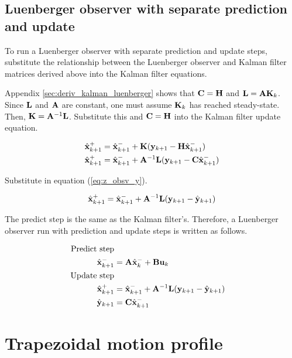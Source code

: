 \subsection{Luenberger observer with separate prediction and update}
\label{subsec:deriv_luenberger_separate}

To run a Luenberger \gls{observer} with separate prediction and update steps,
substitute the relationship between the Luenberger \gls{observer} and Kalman
filter matrices derived above into the Kalman filter equations.

Appendix \ref{sec:deriv_kalman_luenberger} shows that $\mathbf{C} = \mathbf{H}$ and
$\mathbf{L} = \mathbf{A}\mathbf{K}_k$. Since $\mathbf{L}$ and $\mathbf{A}$ are constant, one
must assume $\mathbf{K}_k$ has reached steady-state. Then,
$\mathbf{K} = \mathbf{A}^{-1}\mathbf{L}$. Substitute this and $\mathbf{C} = \mathbf{H}$ into
the Kalman filter update equation.

\begin{align*}
  \hat{\mathbf{x}}_{k+1}^+ &= \hat{\mathbf{x}}_{k+1}^- + \mathbf{K}(\mathbf{y}_{k+1} -
    \mathbf{H}\hat{\mathbf{x}}_{k+1}^-) \\
  \hat{\mathbf{x}}_{k+1}^+ &= \hat{\mathbf{x}}_{k+1}^- + \mathbf{A}^{-1}\mathbf{L}
    (\mathbf{y}_{k+1} - \mathbf{C}\hat{\mathbf{x}}_{k+1}^-)
\end{align*}

Substitute in equation (\ref{eq:z_obsv_y}).

\begin{equation*}
  \hat{\mathbf{x}}_{k+1}^+ = \hat{\mathbf{x}}_{k+1}^- + \mathbf{A}^{-1}\mathbf{L}
    (\mathbf{y}_{k+1} - \hat{\mathbf{y}}_{k+1})
\end{equation*}

The predict step is the same as the Kalman filter's. Therefore, a Luenberger
\gls{observer} run with prediction and update steps is written as follows.

\begin{align}
  \text{Predict step} \nonumber \\
  \hat{\mathbf{x}}_{k+1}^- &= \mathbf{A}\hat{\mathbf{x}}_k^- + \mathbf{B}\mathbf{u}_k \\
  \text{Update step} \nonumber \\
  \hat{\mathbf{x}}_{k+1}^+ &= \hat{\mathbf{x}}_{k+1}^- + \mathbf{A}^{-1}\mathbf{L}
    (\mathbf{y}_{k+1} - \hat{\mathbf{y}}_{k+1}) \\
  \hat{\mathbf{y}}_{k+1} &= \mathbf{C} \hat{\mathbf{x}}_{k+1}^-
\end{align}

\section{Trapezoidal motion profile}
\label{sec:deriv_trapezoid_profile}
